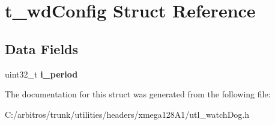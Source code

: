 \hypertarget{structt__wd_config}{\section{t\-\_\-wd\-Config Struct Reference}
\label{structt__wd_config}
}
\subsection*{Data Fields}
\begin{DoxyCompactItemize}
\item 
\hypertarget{structt__wd_config_add933ab8ce934f093e4cd736a7c8de43}{uint32\-\_\-t {\bfseries i\-\_\-period}}\label{structt__wd_config_add933ab8ce934f093e4cd736a7c8de43}

\end{DoxyCompactItemize}


The documentation for this struct was generated from the following file\-:\begin{DoxyCompactItemize}
\item 
C\-:/arbitros/trunk/utilities/headers/xmega128\-A1/utl\-\_\-watch\-Dog.\-h\end{DoxyCompactItemize}
